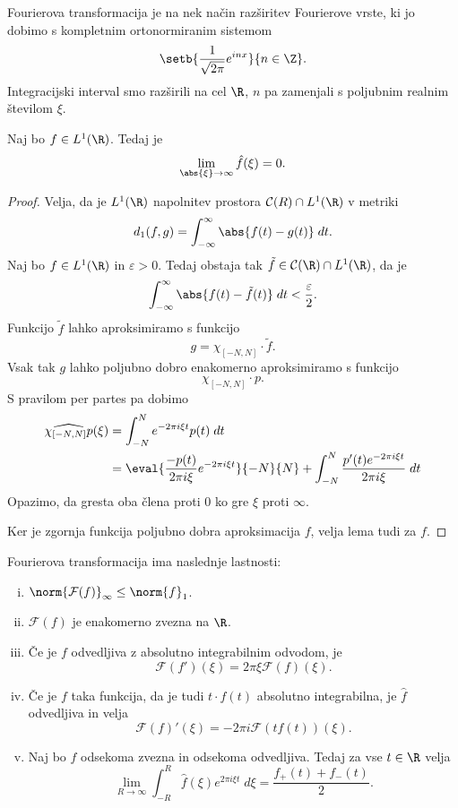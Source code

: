 \begin{opomba}
Fourierova transformacija je na nek način razširitev Fourierove
vrste, ki jo dobimo s kompletnim ortonormiranim sistemom
\[
\setb{\frac{1}{\sqrt{2\pi}} e^{inx}}{n \in \Z}.
\]
Integracijski interval smo razširili na cel $\R$, $n$ pa zamenjali
s poljubnim realnim številom $\xi$.
\end{opomba}


\begin{lema}
Naj bo $f \in L^1(\R)$. Tedaj je
\[
\lim_{\abs{\xi} \to \infty} \hat{f}(\xi) = 0.
\]
\end{lema}

\begin{proof}
Velja, da je $L^1(\R)$ napolnitev prostora
$\mathcal{C}(R) \cap L^1(\R)$ v metriki
\[
d_1(f,g) = \int_{-\infty}^\infty \abs{f(t)-g(t)}\;dt.
\]
Naj bo $f \in L^1(\R)$ in $\varepsilon > 0$. Tedaj obstaja tak
$\tilde{f} \in \mathcal{C}(\R) \cap L^1(\R)$, da je
\[
\int_{-\infty}^\infty \abs{f(t) - \tilde{f}(t)}\;dt <
\frac{\varepsilon}{2}.
\]
Funkcijo $\tilde{f}$ lahko aproksimiramo s funkcijo
\[
g = \chi_{[-N,N]} \cdot \tilde{f}.
\]
Vsak tak $g$ lahko poljubno dobro enakomerno aproksimiramo s
funkcijo
\[
\chi_{[-N,N]} \cdot p.
\]
S pravilom per partes pa dobimo
\begin{align*}
\widehat{\chi_{[-N,N]} p}(\xi) &=
\int_{-N}^N e^{-2 \pi i \xi t} p(t)\;dt
\\
&=
\eval{\frac{-p(t)}{2 \pi i \xi} e^{-2 \pi i \xi t}}{-N}{N} +
\int_{-N}^N \frac{p'(t) e^{-2 \pi i \xi t}}{2 \pi i \xi}\;dt
\end{align*}
Opazimo, da gresta oba člena proti $0$ ko gre $\xi$ proti $\infty$.

Ker je zgornja funkcija poljubno dobra aproksimacija $f$, velja
lema tudi za $f$.
\end{proof}
 
\begin{trditev}
Fourierova transformacija ima naslednje lastnosti:

\begin{enumerate}[i)]
\item $\norm{\mathcal{F}(f)}_\infty \leq \norm{f}_1$.
\item $\mathcal{F}(f)$ je enakomerno zvezna na $\R$.
\item Če je $f$ odvedljiva z absolutno integrabilnim odvodom, je
\[
\mathcal{F}(f')(\xi) = 2\pi \xi \mathcal{F}(f)(\xi).
\]
\item Če je $f$ taka funkcija, da je tudi $t \cdot f(t)$ absolutno
integrabilna, je $\hat{f}$ odvedljiva in velja
\[
\mathcal{F}(f)'(\xi) = -2 \pi i \mathcal{F}(tf(t))(\xi).
\]
\item Naj bo $f$ odsekoma zvezna in odsekoma odvedljiva. Tedaj za
vse $t \in \R$ velja
\[
\lim_{R \to \infty} \int_{-R}^R \hat{f}(\xi)e^{2 \pi i \xi t}\;d\xi
= \frac{f_+(t) + f_-(t)}{2}.
\]
\end{enumerate}
\end{trditev}

